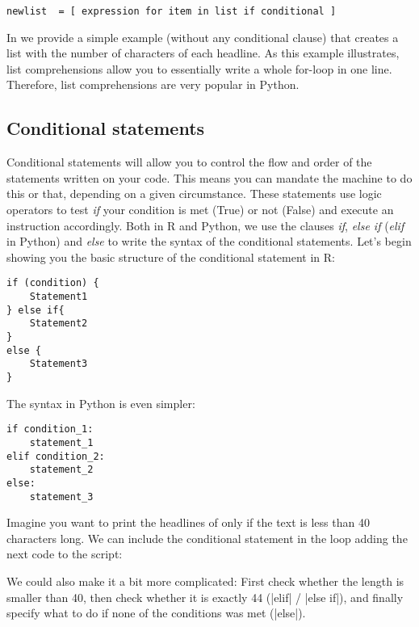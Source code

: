 \begin{verbatim}
newlist  = [ expression for item in list if conditional ]
\end{verbatim}

In  we provide a simple example (without any
conditional clause) that creates a list with the number of characters
of each headline. As this example illustrates, list comprehensions
allow you to essentially write a whole for-loop in one
line. Therefore, list comprehensions are very popular in Python.




\subsection{Conditional statements}

Conditional statements will allow you to control the flow and order of
the statements written on your code. This means you can mandate the
machine to do this or that, depending on a given circumstance. These
statements use logic operators to test \emph{if} your condition is met
(True) or not (False) and execute an instruction accordingly. Both in
R and Python, we use the clauses \emph{if}, \emph{else if}
(\emph{elif} in Python) and \emph{else} to write the syntax of the
conditional statements. Let's begin showing you the basic structure of
the conditional statement in R:

\begin{verbatim}
if (condition) {
    Statement1
} else if{
    Statement2
}
else {
    Statement3
}
\end{verbatim}

The syntax in Python is even simpler:

\begin{verbatim}
if condition_1:
    statement_1
elif condition_2:
    statement_2
else:
    statement_3
\end{verbatim}

Imagine you want to print the headlines of  only if the text is less than 40 characters long. We can include the conditional statement in the loop adding the next code to the script:


We could also make it a bit more complicated: First check whether the length is smaller than 40, then check whether it is exactly 44 (|elif| / |else if|), and finally specify what to do if none of the conditions was met (|else|).


